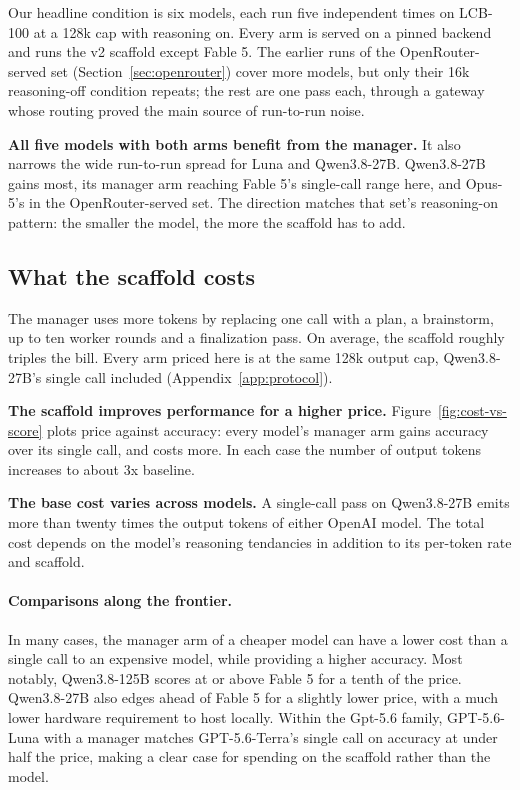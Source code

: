 \documentclass{article}
\begin{document}


Our headline condition is six models, each run five independent times on LCB-100 at a 128k
cap with reasoning on. Every arm is served on a pinned backend and runs the v2 scaffold except Fable 5. The
earlier runs of the OpenRouter-served set (Section~\ref{sec:openrouter}) cover more models,
but only their 16k reasoning-off condition repeats; the rest are one pass each, through a
gateway whose routing proved the main source of run-to-run noise.

\textbf{All five models with both arms benefit from the manager.} It also narrows
the wide run-to-run spread for Luna and Qwen3.8-27B. Qwen3.8-27B gains most, its manager arm
reaching Fable 5's single-call range here, and Opus-5's in the OpenRouter-served set. The
direction matches that set's reasoning-on pattern: the smaller the model, the more the
scaffold has to add.

\subsection{What the scaffold costs} 
\label{sec:cost}

The manager uses more tokens by replacing one call
with a plan, a brainstorm, up to ten worker rounds and a finalization pass. On average, the scaffold roughly triples the bill. Every arm
priced here is at the same 128k output cap, Qwen3.8-27B's single call included
(Appendix~\ref{app:protocol}).





\textbf{The scaffold improves performance for a higher price.}
Figure~\ref{fig:cost-vs-score} plots price against accuracy: every model's manager arm gains accuracy over its single
call, and costs more. In each case the number of output tokens increases to about 3x baseline.
 
\textbf{The base cost varies across models.} A single-call pass on Qwen3.8-27B emits more
than twenty times the output tokens of either OpenAI model. The total cost depends on the model's reasoning tendancies in addition to its per-token rate and scaffold.

\paragraph{Comparisons along the frontier.}
In many cases, the manager arm of a cheaper model can have a lower cost than a single call to an expensive model, while providing a higher accuracy. Most notably, Qwen3.8-125B scores at or above Fable 5 for a tenth of the price. Qwen3.8-27B also edges ahead of Fable 5 for a slightly lower price, with a much lower hardware requirement to host locally. Within the Gpt-5.6 family, GPT-5.6-Luna with a manager matches GPT-5.6-Terra’s single call on accuracy at under half the price, making a clear case for spending on the scaffold rather than the model.
\end{document}
